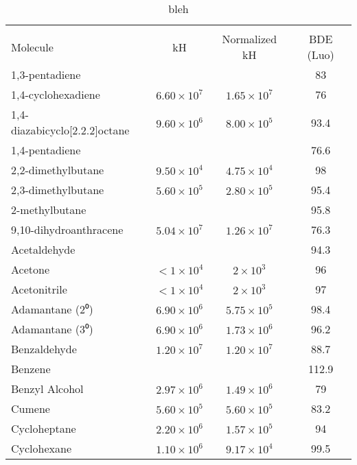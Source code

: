 \begin{longtable}{l | c c c}
\centering
\caption{bleh} \label{tab:expt-bde} \\
 Molecule                       & kH           & Normalized kH & BDE (Luo) \\
\hline
 1,3-pentadiene                 &                &                &        83 \\
 1,4-cyclohexadiene             & $ 6.60 \times 10^7$ & $1.65 \times 10^7 $ &        76 \\
 1,4-diazabicyclo[2.2.2]octane  & $ 9.60 \times 10^6$ & $8.00 \times 10^5 $ &      93.4 \\
 1,4-pentadiene                 &                &                &      76.6 \\
 2,2-dimethylbutane             & $ 9.50 \times 10^4$ & $4.75 \times 10^4 $ &        98 \\
 2,3-dimethylbutane             & $ 5.60 \times 10^5$ & $2.80 \times 10^5 $ &      95.4 \\
 2-methylbutane                 &                &                &      95.8 \\
 9,10-dihydroanthracene         & $ 5.04 \times 10^7$ & $1.26 \times 10^7 $ &      76.3 \\
 Acetaldehyde                   &                &                &      94.3 \\
 Acetone                        & $ < 1 \times 10^4 $ & $2 \times 10^3    $ &        96 \\
 Acetonitrile                   & $ < 1 \times 10^4 $ & $2 \times 10^3    $ &        97 \\
 Adamantane (2⁰)                & $ 6.90 \times 10^6$ & $5.75 \times 10^5 $ &      98.4 \\
 Adamantane (3⁰)                & $ 6.90 \times 10^6$ & $1.73 \times 10^6 $ &      96.2 \\
 Benzaldehyde                   & $ 1.20 \times 10^7$ & $1.20 \times 10^7 $ &      88.7 \\
 Benzene                        &                &                &     112.9 \\
 Benzyl Alcohol                 & $ 2.97 \times 10^6$ & $1.49 \times 10^6 $ &        79 \\
 Cumene                         & $ 5.60 \times 10^5$ & $5.60 \times 10^5 $ &      83.2 \\
 Cycloheptane                   & $ 2.20 \times 10^6$ & $1.57 \times 10^5 $ &        94 \\
 Cyclohexane                    & $ 1.10 \times 10^6$ & $9.17 \times 10^4 $ &      99.5 \\

\end{longtable}
